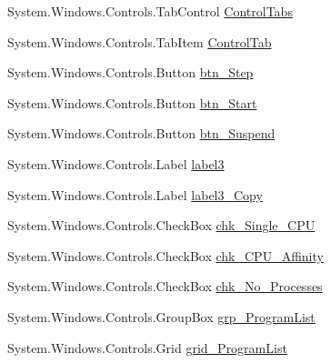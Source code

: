\begin{DoxyCompactItemize}
\item 
System.\+Windows.\+Controls.\+Tab\+Control \hyperlink{class_c_p_u___o_s___simulator_1_1_operating_system_main_window_aad49944b6a55d895806ca01be83440e7}{Control\+Tabs}
\item 
System.\+Windows.\+Controls.\+Tab\+Item \hyperlink{class_c_p_u___o_s___simulator_1_1_operating_system_main_window_a06541ab6c749adc4696fe5ec1f174fcf}{Control\+Tab}
\item 
System.\+Windows.\+Controls.\+Button \hyperlink{class_c_p_u___o_s___simulator_1_1_operating_system_main_window_aa7fab2cb43aa4eefed8e3bcba47a539b}{btn\+\_\+\+Step}
\item 
System.\+Windows.\+Controls.\+Button \hyperlink{class_c_p_u___o_s___simulator_1_1_operating_system_main_window_a811cecc7b1fa49c7f340be7377ff7f32}{btn\+\_\+\+Start}
\item 
System.\+Windows.\+Controls.\+Button \hyperlink{class_c_p_u___o_s___simulator_1_1_operating_system_main_window_abb2c3824f2ed103814e81c8a6bf5452e}{btn\+\_\+\+Suspend}
\item 
System.\+Windows.\+Controls.\+Label \hyperlink{class_c_p_u___o_s___simulator_1_1_operating_system_main_window_a731180865f00c29a9d6affd3ba2860c1}{label3}
\item 
System.\+Windows.\+Controls.\+Label \hyperlink{class_c_p_u___o_s___simulator_1_1_operating_system_main_window_ab76c53e23eb4219d850c3b7a85bf1dd7}{label3\+\_\+\+Copy}
\item 
System.\+Windows.\+Controls.\+Check\+Box \hyperlink{class_c_p_u___o_s___simulator_1_1_operating_system_main_window_a7d57ae7ba4ca24e126fabf4d124f7812}{chk\+\_\+\+Single\+\_\+\+C\+P\+U}
\item 
System.\+Windows.\+Controls.\+Check\+Box \hyperlink{class_c_p_u___o_s___simulator_1_1_operating_system_main_window_a5f027a391759480d1d00c76c2171c6b9}{chk\+\_\+\+C\+P\+U\+\_\+\+Affinity}
\item 
System.\+Windows.\+Controls.\+Check\+Box \hyperlink{class_c_p_u___o_s___simulator_1_1_operating_system_main_window_a61ea8b3bc04203f4a4caa33f21089d18}{chk\+\_\+\+No\+\_\+\+Processes}
\item 
System.\+Windows.\+Controls.\+Group\+Box \hyperlink{class_c_p_u___o_s___simulator_1_1_operating_system_main_window_a9dca0481c9d2ec99d42298352858be2b}{grp\+\_\+\+Program\+List}
\item 
System.\+Windows.\+Controls.\+Grid \hyperlink{class_c_p_u___o_s___simulator_1_1_operating_system_main_window_a22160eecd007b7aedf48db6c64eb2da6}{grid\+\_\+\+Program\+List}

\end{DoxyCompactItemize}
